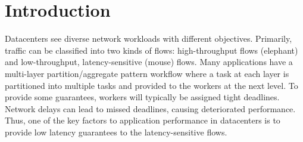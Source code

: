 \section{Introduction}
Datacenters see diverse network workloads with different objectives. Primarily, traffic can be classified into two kinds of flows: high-throughput flows (elephant) and low-throughput, latency-sensitive (mouse) flows. Many applications have a multi-layer partition/aggregate pattern workflow where a task at each layer is partitioned into multiple tasks and provided to the workers at the next level. To provide some guarantees, workers will typically be assigned tight deadlines. Network delays can lead to missed deadlines, causing deteriorated performance. Thus,
one of the key factors to application performance in datacenters is to provide low latency guarantees to the latency-sensitive flows.  
